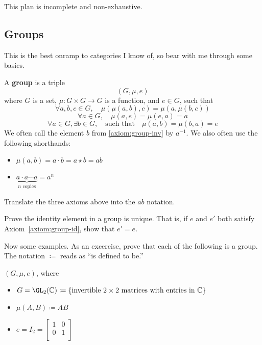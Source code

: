 This plan is incomplete and non-exhaustive.




\subsection{Groups}
This is the best onramp to categories I know of, so bear with me through some basics.
\begin{definition}
    A {\bf group} is a triple \[ (G,\mu,e)\] where $G$ is a set, 
    $\mu:G\times G\to G$ is a function, and $e\in G$, such that 
    \begin{equation*}\tag{Associativity}
        \forall a,b,c\in G, \quad \mu(\mu(a,b),c) = \mu(a,\mu(b,c))
    \end{equation*}\label{axiom:group-assoc}
    \begin{equation*}\tag{Identity}
        \forall a\in G, \quad \mu(a,e) = \mu(e,a) = a
    \end{equation*}\label{axiom:group-id}
    \begin{equation*}\tag{Inverse}
        \forall a\in G, \exists b\in G, \quad\text{such that}\quad \mu(a,b)=\mu(b,a)=e
    \end{equation*}\label{axiom:group-inv}
    We often call the element $b$ from \ref{axiom:group-inv} by $a^{-1}$.
    We also often use the following shorthands:
    \begin{itemize}
        \item $\mu(a,b) = a\cdot b = a\star b = ab$
        \item $\underbrace{a\cdot a\cdots a}_{\text{$n$ copies}} = a^n$
    \end{itemize}
\end{definition}

\begin{exercise}
    Translate the three axioms above into the $ab$ notation.
\end{exercise}

\begin{exercise}
    Prove the identity element in a group is unique. 
    That is, if $e$ and $e'$ both satisfy Axiom~\ref{axiom:group-id},
    show that $e'=e$.
\end{exercise}

Now some examples. 
As an excercise, prove that each of the following is a group. 
The notation $\coloneq$ reads as ``is defined to be.''

\begin{example}
    $(G,\mu,e)$, where
    \begin{itemize}
        \item $G = \GL_2(\C) \coloneq \{ \text{invertible $2\times 2$ matrices with entries in $\C$}\}$
        \item $\mu(A,B) \coloneq AB$
        \item $e=I_2 = \begin{bmatrix} 1&0\\0&1\\ \end{bmatrix}$
    \end{itemize}
\end{example}

